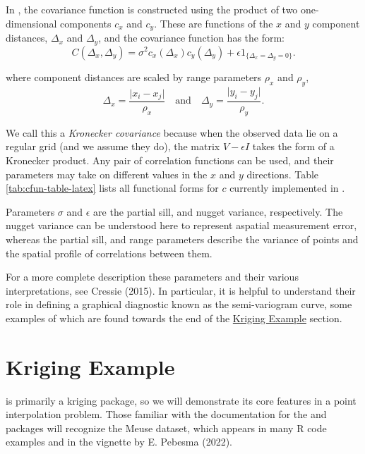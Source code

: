 In , the covariance function is constructed using the product of two one-dimensional components \(c_x\) and \(c_y\). These are functions of the \(x\) and \(y\) component distances, \(\Delta_x\) and \(\Delta_y\), and the covariance function has the form:
\begin{equation}
C \left( \Delta_x, \Delta_y \right) = \sigma^2 c_x \left( \Delta_x \right) c_y \left( \Delta_y \right) + \epsilon 1_{ \{ \Delta_x = \Delta_y = 0 \}}. \label{eq:covfun}
\end{equation}

where component distances are scaled by range parameters \(\rho_x\) and \(\rho_y\),
\begin{equation}
\Delta_x = \frac{ \lvert x_i - x_j \rvert }{ \rho_x } \quad \text{and} \quad \Delta_y = \frac{ \lvert y_i - y_j \rvert }{ \rho_y }. \label{eq:dfun}
\end{equation}

We call this a \emph{Kronecker covariance} because when the observed data lie on a regular grid (and we assume they do), the matrix \(V - \epsilon I\) takes the form of a Kronecker product. Any pair of correlation functions can be used, and their parameters may take on different values in the \(x\) and \(y\) directions.
Table \ref{tab:cfun-table-latex}
lists all functional forms for \(c\) currently implemented in .

Parameters \(\sigma\) and \(\epsilon\) are the partial sill, and nugget variance, respectively. The nugget variance can be understood here to represent aspatial measurement error, whereas the partial sill, and range parameters describe the variance of points and the spatial profile of correlations between them.

For a more complete description these parameters and their various interpretations, see Cressie (2015). In particular, it is helpful to understand their role in defining a graphical diagnostic known as the semi-variogram curve, some examples of which are found towards the end of the \protect\hyperlink{kriging-example}{Kriging Example} section.

\hypertarget{kriging-example}{%
\section{Kriging Example}\label{kriging-example}}

 is primarily a kriging package, so we will demonstrate its core features in a point interpolation problem. Those familiar with the documentation for the  and  packages will recognize the Meuse dataset, which appears in many R code examples and in the vignette by E. Pebesma (2022).

